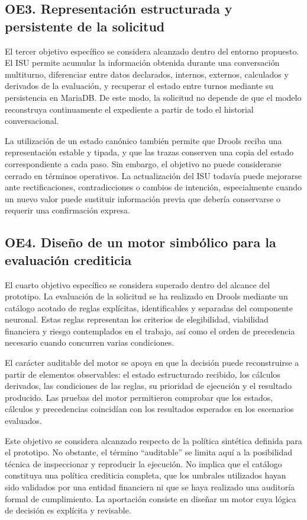 \documentclass[12pt,a4paper]{report}
\begin{document}
\subsection{OE3. Representación estructurada y persistente de la solicitud}

El tercer objetivo específico se considera alcanzado dentro del entorno propuesto. El ISU permite acumular la información obtenida durante una conversación multiturno, diferenciar entre datos declarados, internos, externos, calculados y derivados de la evaluación, y recuperar el estado entre turnos mediante su persistencia en MariaDB. De este modo, la solicitud no depende de que el modelo reconstruya continuamente el expediente a partir de todo el historial conversacional.

La utilización de un estado canónico también permite que Drools reciba una representación estable y tipada, y que las trazas conserven una copia del estado correspondiente a cada paso. Sin embargo, el objetivo no puede considerarse cerrado en términos operativos. La actualización del ISU todavía puede mejorarse ante rectificaciones, contradicciones o cambios de intención, especialmente cuando un nuevo valor puede sustituir información previa que debería conservarse o requerir una confirmación expresa.

\subsection{OE4. Diseño de un motor simbólico para la evaluación crediticia}

El cuarto objetivo específico se considera superado dentro del alcance del prototipo. La evaluación de la solicitud se ha realizado en Drools mediante un catálogo acotado de reglas explícitas, identificables y separadas del componente neuronal. Estas reglas representan los criterios de elegibilidad, viabilidad financiera y riesgo contemplados en el trabajo, así como el orden de precedencia necesario cuando concurren varias condiciones.

El carácter auditable del motor se apoya en que la decisión puede reconstruirse a partir de elementos observables: el estado estructurado recibido, los cálculos derivados, las condiciones de las reglas, su prioridad de ejecución y el resultado producido. Las pruebas del motor permitieron comprobar que los estados, cálculos y precedencias coincidían con los resultados esperados en los escenarios evaluados.

Este objetivo se considera alcanzado respecto de la política sintética definida para el prototipo. No obstante, el término ``auditable'' se limita aquí a la posibilidad técnica de inspeccionar y reproducir la ejecución. No implica que el catálogo constituya una política crediticia completa, que los umbrales utilizados hayan sido validados por una entidad financiera ni que se haya realizado una auditoría formal de cumplimiento. La aportación consiste en diseñar un motor cuya lógica de decisión es explícita y revisable.
\end{document}
